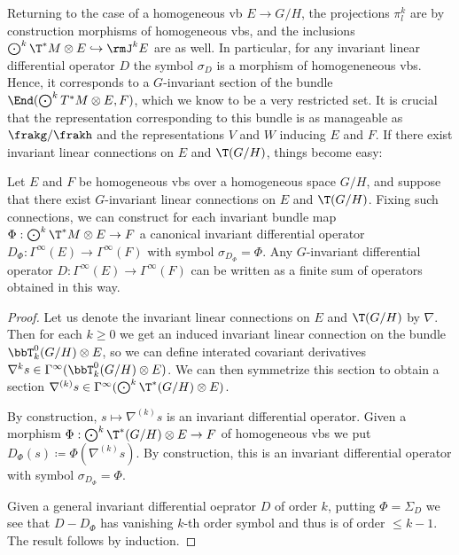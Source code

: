 Returning to the case of a homogeneous \gls{vb} $E\to G\slash H$, the projections $\pi^k_l$ are by construction morphisms of homogeneous \glspl{vb}, and the inclusions $\bigodot^k\T^\ast M\otimes E\hookrightarrow \rmJ^k E$ are as well. In particular, for any invariant linear differential operator $D$ the symbol $\sigma_D$ is a morphism of homogeneneous \glspl{vb}. Hence, it corresponds to a $G$-invariant section of the bundle $\End(\bigodot^k T^\ast M\otimes E,F)$, which we know to be a very restricted set. It is crucial that the representation corresponding to this bundle is as manageable as $\frakg\slash\frakh$ and the representations $V$ and $W$ inducing $E$ and $F$. If there exist invariant linear connections on $E$ and $\T (G\slash H)$, things become easy:

\begin{prop}\label{prop 1.4.9 Cap}
    Let $E$ and $F$ be homogeneous \glspl{vb} over a homogeneous space $G\slash H$, and suppose that there exist $G$-invariant linear connections on $E$ and $\T(G\slash H)$. Fixing such connections, we can construct for each invariant bundle map $\Phi:\bigodot^k\T^\ast M\otimes E\to F$ a canonical invariant differential operator $D_\Phi:\Gamma^\infty(E)\to \Gamma^\infty(F)$ with symbol $\sigma_{D_{\Phi}}=\Phi$. Any $G$-invariant differential operator $D:\Gamma^\infty(E)\to \Gamma^\infty(F)$ can be written as a finite sum of operators obtained in this way.
\end{prop}
\begin{proof}
    Let us denote the invariant linear connections on $E$ and $\T (G\slash H)$ by $\nabla$. Then for each $k\geq 0$ we get an induced invariant linear connection on the bundle $\bbT^0_k(G\slash H)\otimes E$, so we can define interated covariant derivatives $\nabla^k s\in\Gamma^\infty(\bbT^0_k (G\slash H)\otimes E)$. We can then symmetrize this section to obtain a section $\nabla^{(k)}s\in \Gamma^\infty(\bigodot^k \T^\ast (G\slash H)\otimes E)$.

    By construction, $s\mapsto \nabla^{(k)}s$ is an invariant differential operator. Given a morphism $\Phi:\bigodot^k\T^\ast (G\slash H)\otimes E\to F$ of homogeneous \glspl{vb} we put $D_\Phi(s)\coloneqq \Phi(\nabla^{(k)}s)$. By construction, this is an invariant differential operator with symbol $\sigma_{D_\Phi}=\Phi$.

    Given a general invariant differential oeprator $D$ of order $k$, putting $\Phi=\varSigma_D$ we see that $D-D_\Phi$ has vanishing $k$-th order symbol and thus is of order $\leq k-1$. The result follows by induction.
\end{proof}


